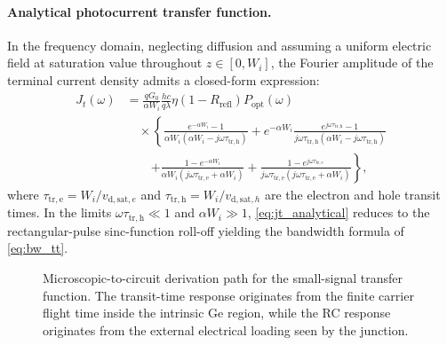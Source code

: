 \paragraph{Analytical photocurrent transfer function.}
In the frequency domain, neglecting diffusion and assuming a uniform electric
field at saturation value throughout $z\in[0,W_i]$, the Fourier amplitude of
the terminal current density admits a closed-form expression:
\begin{align}
    J_t(\omega)
    &= \frac{q G_0}{\alpha W_i}\frac{hc}{q\lambda}
       \eta(1-R_{\mathrm{refl}})P_{\mathrm{opt}}(\omega)\nonumber\\
    &\quad\times\!
      \left\{
        \frac{e^{-\alpha W_i}-1}{\alpha W_i(\alpha W_i - j\omega\tau_{\mathrm{tr,h}})}
        + e^{-\alpha W_i}
          \frac{e^{j\omega\tau_{\mathrm{tr,h}}}-1}
               {j\omega\tau_{\mathrm{tr,h}}(\alpha W_i - j\omega\tau_{\mathrm{tr,h}})}
      \right.\nonumber\\
    &\quad\quad\left.
        + \frac{1 - e^{-\alpha W_i}}{\alpha W_i(j\omega\tau_{\mathrm{tr,e}} + \alpha W_i)}
        + \frac{1 - e^{j\omega\tau_{\mathrm{tr,e}}}}{j\omega\tau_{\mathrm{tr,e}}
          (j\omega\tau_{\mathrm{tr,e}} + \alpha W_i)}
      \right\},
    \label{eq:jt_analytical}
\end{align}
where $\tau_{\mathrm{tr,e}}=W_i/v_{\mathrm{d,sat},e}$ and
$\tau_{\mathrm{tr,h}}=W_i/v_{\mathrm{d,sat},h}$ are the electron and hole
transit times. In the limits $\omega\tau_{\mathrm{tr,h}}\ll1$ and
$\alpha W_i\gg1$, \cref{eq:jt_analytical} reduces to the rectangular-pulse
sinc-function roll-off yielding the bandwidth formula of \cref{eq:bw_tt}.

\begin{figure}[H]
    \centering
    \caption{Microscopic-to-circuit derivation path for the small-signal transfer
    function. The transit-time response originates from the finite carrier flight
    time inside the intrinsic Ge region, while the RC response originates from
    the external electrical loading seen by the junction.}
    \label{fig:transfer_derivation}
\end{figure}

